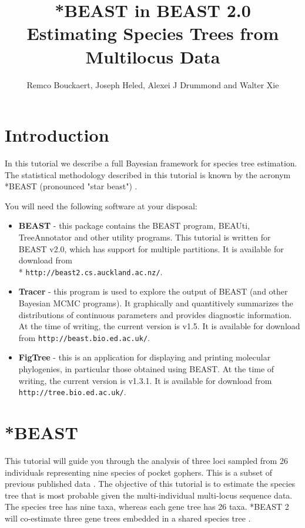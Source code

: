 \documentclass{article}
\newcommand{\BEASTVersion}{2.0}
\newcommand{\TracerVersion}{1.5}
\newcommand{\FigTreeVersion}{1.3.1}
\begin{document}
\title{*BEAST in BEAST 2.0\\
Estimating Species Trees from Multilocus Data}

\author{Remco Bouckaert, Joseph Heled, Alexei J Drummond and Walter Xie}

\maketitle

\section{Introduction}

In this tutorial we describe a full Bayesian framework for species tree estimation. The statistical methodology described in this tutorial is known by the acronym *BEAST (pronounced "star beast") \cite{Heled:2010fk}.

You will need the following software at your disposal:

\begin{itemize}

\item {\bf BEAST} - this package contains the BEAST program, BEAUti, TreeAnnotator and other utility programs. This tutorial is written for BEAST v{\BEASTVersion}, which has support for multiple partitions. It is available for download from \\* \texttt{http://beast2.cs.auckland.ac.nz/}.
\item {\bf Tracer} - this program is used to explore the output of BEAST (and other Bayesian MCMC programs). It graphically and
quantitively summarizes the distributions of continuous parameters and provides diagnostic information. At the time of
writing, the current version is v{\TracerVersion}. It is available for download from \texttt{http://beast.bio.ed.ac.uk/}.
\item {\bf FigTree} - this is an application for displaying and printing molecular phylogenies, in particular those obtained using
BEAST. At the time of writing, the current version is v{\FigTreeVersion}. It is available for download from \texttt{http://tree.bio.ed.ac.uk/}.
\end{itemize}

\section{*BEAST}

This tutorial will guide you through the analysis of three loci sampled from 26 individuals representing nine species of pocket gophers. This is a subset of previous published data \cite{belfiore2008multilocus}. The objective of this tutorial is to estimate the species tree that is most probable given the multi-individual multi-locus sequence data. The species tree has nine taxa, whereas each gene tree has 26 taxa. *BEAST 2 will co-estimate three gene trees embedded in a shared species tree \cite[for details]{Heled:2010fk}.
\end{document}
